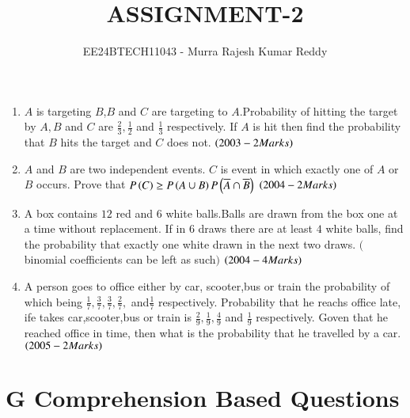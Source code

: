 \documentclass[journal,12pt,onecolumn,article]{IEEEtran}
\theoremstyle{remark}
\begin{document}

\vspace{3cm}
\title{ASSIGNMENT-2}
\author{EE24BTECH11043 - Murra Rajesh Kumar Reddy}
\maketitle
\bigskip
\begin{enumerate}
\item $A$ is targeting $B$,$B$ and $C$ are targeting to $A$.Probability of hitting the target by $A,B$ and $C$ are $\frac{2}{3},\frac{1}{2}$ and $\frac{1}{3}$ respectively. If $A$ is hit then find the probability that $B$ hits the target and $C$ does not. \hfill{$\left(2003-2 Marks\right)$}
\item $A$ and $B$ are two independent events. $C$ is event in which exactly one of $A$ or $B$ occurs. Prove that $P\left(C\right)\ge P\left(A\cup B\right)P\left(\overline{A}\cap\overline{B}\right)$ \hfill{$\left(2004-2 Marks\right)$}
\item A box contains $12$ red and $6$ white balls.Balls are drawn from the box one at a time without replacement. If in 6 draws there are at least $4$ white balls, find the probability that exactly one white drawn in the next two draws. $($
binomial coefficients can be left as such$)$ \hfill{$\left(2004-4 Marks\right)$}
\item A person goes to office either by car, scooter,bus or train the probability of which being $\frac{1}{7},\frac{3}{7},\frac{3}{7},\frac{2}{7},$ and$\frac{1}{7}$ respectively. Probability that he reachs office late, ife takes car,scooter,bus or train is $\frac{2}{9},\frac{1}{9},\frac{4}{9}$ and $\frac{1}{9}$ respectively. Goven that he reached office in time, then what is the probability that he travelled by a car. \hfill{$\left(2005-2 Marks\right)$}
\end{enumerate}
\section*{G Comprehension Based Questions}
\end{document}

